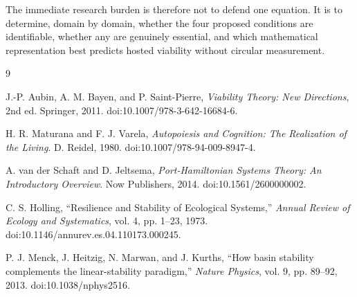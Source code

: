 The immediate research burden is therefore not to defend one equation. It is to determine, domain by domain, whether the four proposed conditions are identifiable, whether any are genuinely essential, and which mathematical representation best predicts hosted viability without circular measurement.


\begin{thebibliography}{9}

J.-P. Aubin, A. M. Bayen, and P. Saint-Pierre,
\emph{Viability Theory: New Directions}, 2nd ed.
Springer, 2011. doi:10.1007/978-3-642-16684-6.

H. R. Maturana and F. J. Varela,
\emph{Autopoiesis and Cognition: The Realization of the Living}.
D. Reidel, 1980. doi:10.1007/978-94-009-8947-4.

A. van der Schaft and D. Jeltsema,
\emph{Port-Hamiltonian Systems Theory: An Introductory Overview}.
Now Publishers, 2014. doi:10.1561/2600000002.

C. S. Holling,
``Resilience and Stability of Ecological Systems,''
\emph{Annual Review of Ecology and Systematics}, vol. 4, pp. 1--23, 1973.
doi:10.1146/annurev.es.04.110173.000245.

P. J. Menck, J. Heitzig, N. Marwan, and J. Kurths,
``How basin stability complements the linear-stability paradigm,''
\emph{Nature Physics}, vol. 9, pp. 89--92, 2013.
doi:10.1038/nphys2516.

\end{thebibliography}
